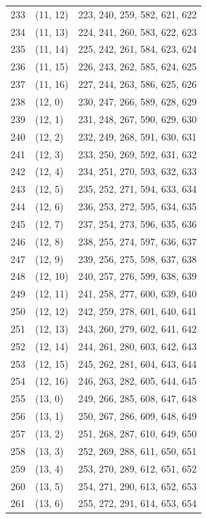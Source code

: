 \documentclass{article}
\begin{document}
\begin{longtable}{lll}
  233 & (11, 12) & 223, 240, 259, 582, 621, 622 \\
  234 & (11, 13) & 224, 241, 260, 583, 622, 623 \\
  235 & (11, 14) & 225, 242, 261, 584, 623, 624 \\
  236 & (11, 15) & 226, 243, 262, 585, 624, 625 \\
  237 & (11, 16) & 227, 244, 263, 586, 625, 626 \\
  238 & (12, 0) & 230, 247, 266, 589, 628, 629 \\
  239 & (12, 1) & 231, 248, 267, 590, 629, 630 \\
  240 & (12, 2) & 232, 249, 268, 591, 630, 631 \\
  241 & (12, 3) & 233, 250, 269, 592, 631, 632 \\
  242 & (12, 4) & 234, 251, 270, 593, 632, 633 \\
  243 & (12, 5) & 235, 252, 271, 594, 633, 634 \\
  244 & (12, 6) & 236, 253, 272, 595, 634, 635 \\
  245 & (12, 7) & 237, 254, 273, 596, 635, 636 \\
  246 & (12, 8) & 238, 255, 274, 597, 636, 637 \\
  247 & (12, 9) & 239, 256, 275, 598, 637, 638 \\
  248 & (12, 10) & 240, 257, 276, 599, 638, 639 \\
  249 & (12, 11) & 241, 258, 277, 600, 639, 640 \\
  250 & (12, 12) & 242, 259, 278, 601, 640, 641 \\
  251 & (12, 13) & 243, 260, 279, 602, 641, 642 \\
  252 & (12, 14) & 244, 261, 280, 603, 642, 643 \\
  253 & (12, 15) & 245, 262, 281, 604, 643, 644 \\
  254 & (12, 16) & 246, 263, 282, 605, 644, 645 \\
  255 & (13, 0) & 249, 266, 285, 608, 647, 648 \\
  256 & (13, 1) & 250, 267, 286, 609, 648, 649 \\
  257 & (13, 2) & 251, 268, 287, 610, 649, 650 \\
  258 & (13, 3) & 252, 269, 288, 611, 650, 651 \\
  259 & (13, 4) & 253, 270, 289, 612, 651, 652 \\
  260 & (13, 5) & 254, 271, 290, 613, 652, 653 \\
  261 & (13, 6) & 255, 272, 291, 614, 653, 654 \\

\end{longtable}
\end{document}
